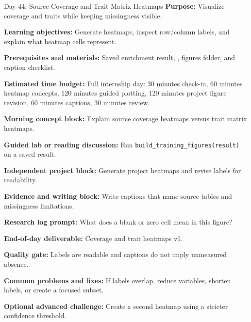 \begin{dailybox}{Day 44: Source Coverage and Trait Matrix Heatmaps}
\textbf{Purpose:} Visualize coverage and traits while keeping missingness visible.

\textbf{Learning objectives:} Generate heatmaps, inspect row/column labels, and explain what heatmap cells represent.

\textbf{Prerequisites and materials:} Saved enrichment result, , figures folder, and caption checklist.

\textbf{Estimated time budget:} Full internship day: 30 minutes check-in, 60 minutes heatmap concepts, 120 minutes guided plotting, 120 minutes project figure revision, 60 minutes captions, 30 minutes review.

\textbf{Morning concept block:} Explain source coverage heatmaps versus trait matrix heatmaps.

\textbf{Guided lab or reading discussion:} Run \texttt{build\_training\_figures(result)} on a saved result.

\textbf{Independent project block:} Generate project heatmaps and revise labels for readability.

\textbf{Evidence and writing block:} Write captions that name source tables and missingness limitations.

\textbf{Research log prompt:} What does a blank or zero cell mean in this figure?

\textbf{End-of-day deliverable:} Coverage and trait heatmaps v1.

\textbf{Quality gate:} Labels are readable and captions do not imply unmeasured absence.

\textbf{Common problems and fixes:} If labels overlap, reduce variables, shorten labels, or create a focused subset.

\textbf{Optional advanced challenge:} Create a second heatmap using a stricter confidence threshold.
\end{dailybox}

